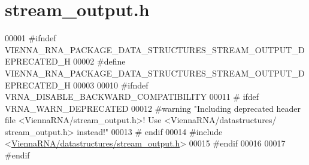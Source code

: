 \hypertarget{stream__output_8h_source}{}\section{stream\+\_\+output.\+h}
\label{stream__output_8h_source}

\begin{DoxyCode}
00001 \textcolor{preprocessor}{#ifndef VIENNA\_RNA\_PACKAGE\_DATA\_STRUCTURES\_STREAM\_OUTPUT\_DEPRECATED\_H}
00002 \textcolor{preprocessor}{#define VIENNA\_RNA\_PACKAGE\_DATA\_STRUCTURES\_STREAM\_OUTPUT\_DEPRECATED\_H}
00003 
00010 \textcolor{preprocessor}{#ifndef VRNA\_DISABLE\_BACKWARD\_COMPATIBILITY}
00011 \textcolor{preprocessor}{# ifdef VRNA\_WARN\_DEPRECATED}
00012 \textcolor{preprocessor}{#warning "Including deprecated header file <ViennaRNA/stream\_output.h>! Use <ViennaRNA/datastructures/
      stream\_output.h> instead!"}
00013 \textcolor{preprocessor}{# endif}
00014 \textcolor{preprocessor}{#include <\hyperlink{datastructures_2stream__output_8h}{ViennaRNA/datastructures/stream\_output.h}>}
00015 \textcolor{preprocessor}{#endif}
00016 
00017 \textcolor{preprocessor}{#endif}
\end{DoxyCode}
